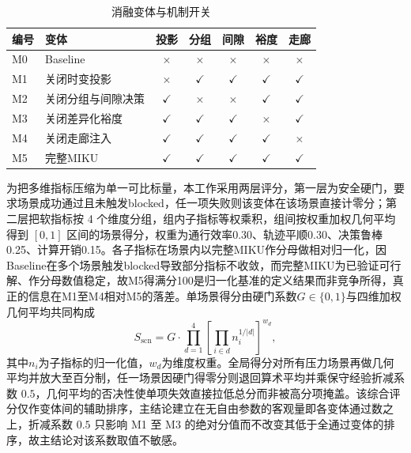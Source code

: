 \documentclass[a4paper,zihao=5]{ctexart}
\theoremstyle{definition}
\begin{document}
\begin{table}[htbp]
\centering
\caption{消融变体与机制开关}
\label{tab:exp_ablation_matrix}
\small
\begin{tabular}{llccccc}
\toprule
\textbf{编号} & \textbf{变体} & 投影 & 分组 & 间隙 & 裕度 & 走廊 \\
\midrule
M0 & Baseline             & $\times$    & $\times$    & $\times$    & $\times$    & $\times$    \\
M1 & 关闭时变投影         & $\times$    & $\checkmark$ & $\checkmark$ & $\checkmark$ & $\checkmark$ \\
M2 & 关闭分组与间隙决策   & $\checkmark$ & $\times$    & $\times$    & $\checkmark$ & $\checkmark$ \\
M3 & 关闭差异化裕度       & $\checkmark$ & $\checkmark$ & $\checkmark$ & $\times$    & $\checkmark$ \\
M4 & 关闭走廊注入         & $\checkmark$ & $\checkmark$ & $\checkmark$ & $\checkmark$ & $\times$    \\
M5 & 完整MIKU             & $\checkmark$ & $\checkmark$ & $\checkmark$ & $\checkmark$ & $\checkmark$ \\
\bottomrule
\end{tabular}
\end{table}

为把多维指标压缩为单一可比标量，本工作采用两层评分，第一层为安全硬门，要求场景成功通过且未触发blocked，任一项失败则该变体在该场景直接计零分；第二层把软指标按 4 个维度分组，组内子指标等权乘积，组间按权重加权几何平均得到 $[0,1]$ 区间的场景得分，权重为通行效率0.30、轨迹平顺0.30、决策鲁棒0.25、计算开销0.15。各子指标在场景内以完整MIKU作分母做相对归一化，因Baseline在多个场景触发blocked导致部分指标不收敛，而完整MIKU为已验证可行解、作分母数值稳定，故M5得满分100是归一化基准的定义结果而非竞争所得，真正的信息在M1至M4相对M5的落差。单场景得分由硬门系数$G \in \{0, 1\}$与四维加权几何平均共同构成
\begin{equation}
S_{\mathrm{scn}} = G \cdot \prod_{d=1}^{4} \left[ \prod_{i \in d} n_i^{1/|d|} \right]^{w_d},
\label{eq:exp_score_scn}
\end{equation}
其中$n_i$为子指标的归一化值，$w_d$为维度权重。全局得分对所有压力场景再做几何平均并放大至百分制，任一场景因硬门得零分则退回算术平均并乘保守经验折减系数 $0.5$，几何平均的否决性使单项失效直接拉低总分而非被高分项掩盖。该综合评分仅作变体间的辅助排序，主结论建立在无自由参数的客观量即各变体通过数之上，折减系数 $0.5$ 只影响 M1 至 M3 的绝对分值而不改变其低于全通过变体的排序，故主结论对该系数取值不敏感。
\end{document}
